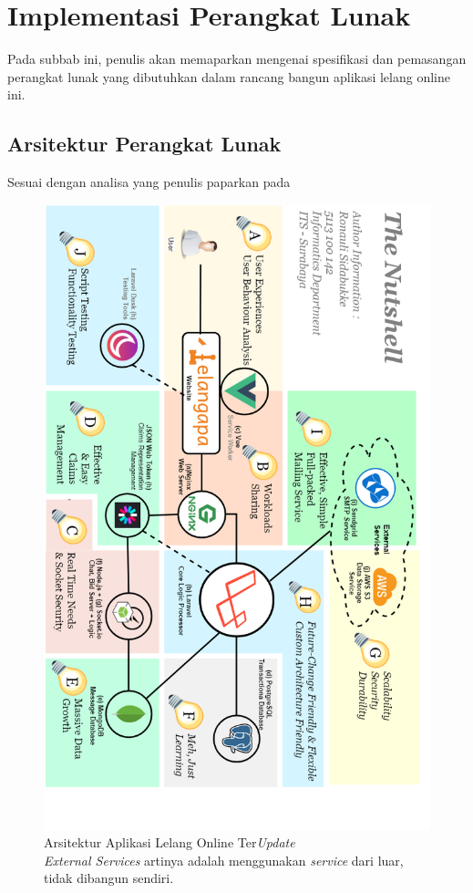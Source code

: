 
  \section{Implementasi Perangkat Lunak}
  Pada subbab ini, penulis akan memaparkan mengenai spesifikasi dan pemasangan perangkat lunak yang dibutuhkan dalam rancang bangun aplikasi lelang online ini.
  
  \subsection{Arsitektur Perangkat Lunak}
  \label{arsitektur-pl-final}
	  Sesuai dengan analisa yang penulis paparkan pada 
	  
	  \begin{figure}[H]
	  	\centering
	  	\includegraphics[height=0.6\paperheight]{images/bab3/diagram/arsitektur-colorized.png}
	  	\caption{Arsitektur Aplikasi Lelang Online Ter\textit{Update} \\
	  		\textit{External Services} artinya adalah menggunakan \textit{service} dari luar, tidak dibangun sendiri. }
	  	\label{arsitektur-app}
	  \end{figure}
  
